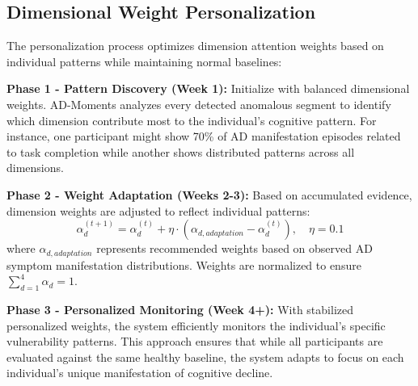 \documentclass[sigconf, anonymous, 9pt, nonacm]{acmart}
\newcommand{\sys}{AD-Moments\xspace}
\begin{document}
\subsection{Dimensional Weight Personalization}

The personalization process optimizes dimension attention weights based on individual patterns while maintaining normal baselines:

\noindent\textbf{Phase 1 - Pattern Discovery (Week 1):} Initialize with balanced dimensional weights. \sys analyzes every detected anomalous segment to identify which dimension contribute most to the individual's cognitive pattern. For instance, one participant might show 70\% of AD manifestation episodes related to task completion while another shows distributed patterns across all dimensions.

\noindent\textbf{Phase 2 - Weight Adaptation (Weeks 2-3):} Based on accumulated evidence, dimension weights are adjusted to reflect individual patterns:
\begin{equation*}
\alpha_d^{(t+1)} = \alpha_d^{(t)} + \eta \cdot (\alpha_{d,adaptation} - \alpha_d^{(t)}), \quad \eta = 0.1
\end{equation*}
where $\alpha_{d,adaptation}$ represents recommended weights based on observed AD symptom manifestation distributions. Weights are normalized to ensure $\sum_{d=1}^{4}\alpha_d = 1$.

\noindent\textbf{Phase 3 - Personalized Monitoring (Week 4+):} With stabilized personalized weights, the system efficiently monitors the individual's specific vulnerability patterns. This approach ensures that while all participants are evaluated against the same healthy baseline, the system adapts to focus on each individual's unique manifestation of cognitive decline.
\end{document}
